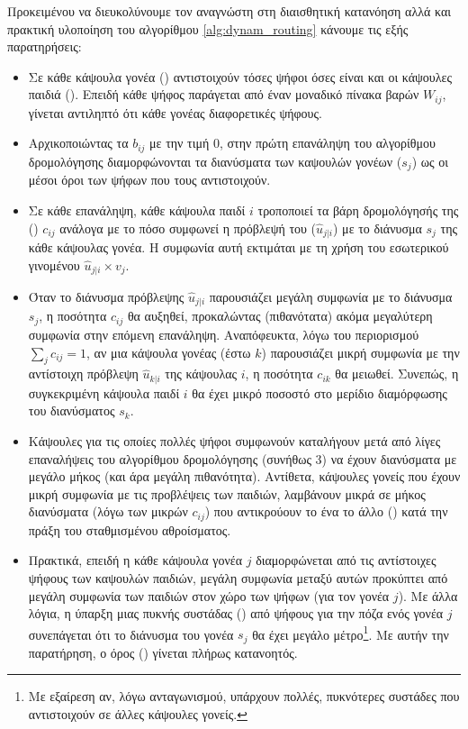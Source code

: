 Προκειμένου να διευκολύνουμε τον αναγνώστη στη διαισθητική κατανόηση αλλά και πρακτική υλοποίηση του αλγορίθμου \ref{alg:dynam_routing} κάνουμε τις εξής παρατηρήσεις:
\begin{itemize}
    \item Σε κάθε κάψουλα γονέα () αντιστοιχούν τόσες ψήφοι όσες είναι και οι κάψουλες παιδιά (). Επειδή κάθε ψήφος παράγεται από έναν μοναδικό πίνακα βαρών $W_{ij}$, γίνεται αντιληπτό ότι κάθε γονέας  διαφορετικές ψήφους.
    \item Αρχικοποιώντας τα $b_{ij}$ με την τιμή $0$, στην πρώτη επανάληψη του αλγορίθμου δρομολόγησης διαμορφώνονται τα διανύσματα των καψουλών γονέων ($s_j$) ως οι μέσοι όροι των ψήφων που τους αντιστοιχούν.
    \item Σε κάθε επανάληψη, κάθε κάψουλα παιδί $i$ τροποποιεί τα βάρη δρομολόγησής της () $c_{ij}$ ανάλογα με το πόσο συμφωνεί η πρόβλεψή του ($\hat{u}_{j|i}$) με το διάνυσμα $s_j$ της κάθε κάψουλας γονέα. Η συμφωνία αυτή εκτιμάται με τη χρήση του εσωτερικού γινομένου $\hat{u}_{j|i} \times v_j$.
    \item Όταν το διάνυσμα πρόβλεψης $\hat{u}_{j|i}$ παρουσιάζει μεγάλη συμφωνία με το διάνυσμα $s_j$, η ποσότητα $c_{ij}$ θα αυξηθεί, προκαλώντας (πιθανότατα) ακόμα μεγαλύτερη συμφωνία στην επόμενη επανάληψη. Αναπόφευκτα, λόγω του περιορισμού $\sum_j c_{ij} = 1$, αν μια κάψουλα γονέας (έστω $k$) παρουσιάζει μικρή συμφωνία με την αντίστοιχη πρόβλεψη $\hat{u}_{k|i}$ της κάψουλας $i$, η ποσότητα $c_{ik}$ θα μειωθεί. Συνεπώς, η συγκεκριμένη κάψουλα παιδί $i$ θα έχει μικρό ποσοστό στο μερίδιο διαμόρφωσης του διανύσματος $s_k$.
    \item Κάψουλες για τις οποίες πολλές ψήφοι συμφωνούν καταλήγουν μετά από λίγες επαναλήψεις του αλγορίθμου δρομολόγησης (συνήθως 3) να έχουν διανύσματα με μεγάλο μήκος (και άρα μεγάλη πιθανότητα). Αντίθετα, κάψουλες γονείς που έχουν μικρή συμφωνία με τις προβλέψεις των παιδιών, λαμβάνουν μικρά σε μήκος διανύσματα (λόγω των μικρών $c_{ij}$) που αντικρούουν το ένα το άλλο () κατά την πράξη του σταθμισμένου αθροίσματος.
    \item Πρακτικά, επειδή η κάθε κάψουλα γονέα $j$ διαμορφώνεται από τις αντίστοιχες ψήφους των καψουλών παιδιών, μεγάλη συμφωνία μεταξύ αυτών προκύπτει από μεγάλη συμφωνία των παιδιών στον χώρο των ψήφων (για τον γονέα $j$). Με άλλα λόγια, η ύπαρξη μιας πυκνής συστάδας () από ψήφους για την πόζα ενός γονέα $j$ συνεπάγεται ότι το διάνυσμα του γονέα $s_j$ θα έχει μεγάλο μέτρο\footnote{Με εξαίρεση αν, λόγω ανταγωνισμού, υπάρχουν πολλές, πυκνότερες συστάδες που αντιστοιχούν σε άλλες κάψουλες γονείς.}. Με αυτήν την παρατήρηση, ο όρος  () γίνεται πλήρως κατανοητός.
\end{itemize}


